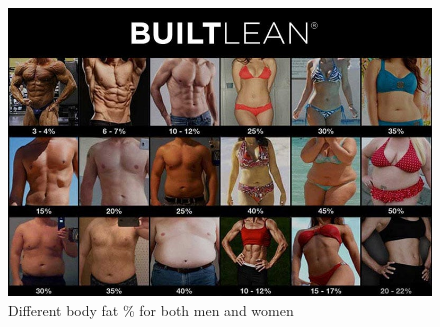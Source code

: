 \documentclass[openany, 12pt]{book}
\begin{document}
	\begin{figure}[h]
		\centering
		\includegraphics[scale=0.6]{bodyfatpercentage.jpg}
		\caption{Different body fat \% for both men and women}
	\end{figure}
	
\end{document}
